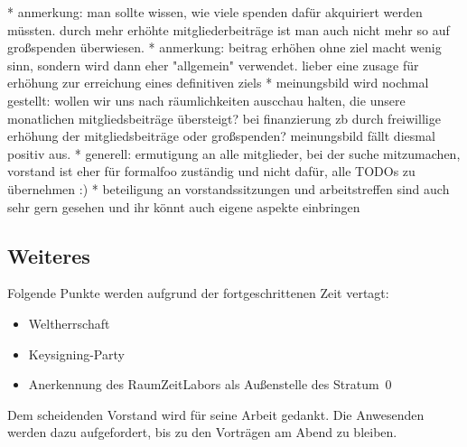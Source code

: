 \documentclass{s0minutes}
\begin{document}
		* anmerkung: man sollte wissen, wie viele spenden dafür akquiriert werden müssten. durch mehr erhöhte mitgliederbeiträge ist man auch nicht mehr so auf großspenden überwiesen.
		* anmerkung: beitrag erhöhen ohne ziel macht wenig sinn, sondern wird dann eher "allgemein" verwendet. lieber eine zusage für erhöhung zur erreichung eines definitiven ziels
		* meinungsbild wird nochmal gestellt: wollen wir uns nach räumlichkeiten auscchau halten, die unsere monatlichen mitgliedsbeiträge übersteigt? bei finanzierung zb durch freiwillige erhöhung der mitgliedsbeiträge oder großspenden? meinungsbild fällt diesmal positiv aus.
		* generell: ermutigung an alle mitglieder, bei der suche mitzumachen, vorstand ist eher für formalfoo zuständig und nicht dafür, alle TODOs zu übernehmen :)
			* beteiligung an vorstandssitzungen und arbeitstreffen sind auch sehr gern gesehen und ihr könnt auch eigene aspekte einbringen

\subsection{Weiteres}

Folgende Punkte werden aufgrund der fortgeschrittenen Zeit vertagt:
\begin{itemize}
  \item Weltherrschaft
  \item Keysigning-Party
  \item Anerkennung des RaumZeitLabors als Außenstelle des Stratum~0
\end{itemize}

Dem scheidenden Vorstand wird für seine Arbeit gedankt. Die Anwesenden werden
dazu aufgefordert, bis zu den Vorträgen am Abend zu bleiben.
\end{document}
